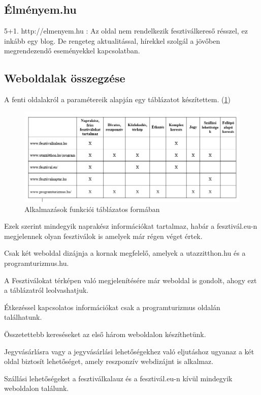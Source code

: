 \subsection{Élményem.hu}

5+1. http://elmenyem.hu : Az oldal nem rendelkezik fesztiválkereső résszel, ez inkább egy blog. De rengeteg aktualitással, hírekkel szolgál a jövőben megrendezendő eseményekkel kapcsolatban. 

\subsection{Weboldalak összegzése}

A fenti oldalakról a paramétereik alapján egy táblázatot készítettem. (\ref{fig:apps}) 

\begin{figure}
\centering
\includegraphics[scale=0.64]{kepek/alkalmazasok.jpg}
\caption{Alkalmazások funkciói táblázatos formában}
\label{fig:apps}
\end{figure}

Ezek szerint mindegyik naprakész információkat tartalmaz, habár a fesztivál.eu-n megjelennek olyan fesztiválok is amelyek már régen véget értek.

Csak két weboldal dizájnja a kornak megfelelő, amelyek a utazzitthon.hu és a programturizmus.hu.

A Fesztiválokat térképen való megjelenítésére már weboldal is gondolt, ahogy ezt a táblázatról leolvashatjuk.

Étkezéssel kapcsolatos információkat csak a programturizmus oldalán találhatunk.

Összetettebb kereséseket az első három weboldalon készíthetünk.

Jegyvásárlásra vagy a jegyvásárlási lehetőségekhez való eljutáshoz ugyanaz a két oldal biztosít lehetőséget, amely reszponzív webdizájnt is alkalmaz.

Szállási lehetőségeket a fesztiválkalauz és a fesztivál.eu-n kívül mindegyik weboldalon találunk.

